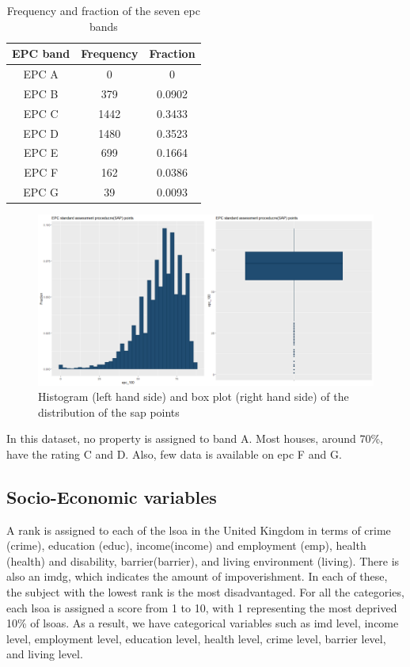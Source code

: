\documentclass[12pt]{article}
\begin{document}
\begin{table}[H]
\centering
\begin{tabular}{c c c} 
 \hline
 EPC band & Frequency & Fraction \\ [0.5ex] 
 \hline
 EPC A & 0 & 0 \\ 
 EPC B & 379 & 0.0902\\
 EPC C & 1442 & 0.3433 \\
 EPC D & 1480 & 0.3523 \\
 EPC E & 699 & 0.1664 \\
 EPC F & 162 & 0.0386 \\
 EPC G & 39 & 0.0093 \\ [1ex] 
 \hline
\end{tabular}
\caption{Frequency and fraction of the seven \acrshort{epc} bands}
\label{table:EPC}
\end{table}


\begin{figure}[H]
    \centering
    \includegraphics[width=17cm]{epc.png}
    \caption{Histogram (left hand side) and box plot (right hand side) of the distribution of the \acrshort{sap} points}
    \label{fig:EPCs}
\end{figure}

In this dataset, no property is assigned to band A. Most houses, around 70\%, have the rating C and D. Also, few data is available on \acrshort{epc} F and G. 

\subsection{Socio-Economic variables}
A rank is assigned to each of the \acrfull{lsoa} in the United Kingdom in terms of crime (\gls{crime}), education (\gls{educ}), income(\gls{income}) and employment (\gls{emp}), health (\gls{health}) and disability, barrier(\gls{barrier}), and living environment (\gls{living}). There is also an \gls{imdg}, which indicates the amount of impoverishment. In each of these, the subject with the lowest rank is the most disadvantaged. For all the categories, each \acrshort{lsoa} is assigned a score from 1 to 10, with 1 representing the most deprived 10\% of \acrshort{lsoa}s. As a result, we have categorical variables such as imd level, income level, employment level, education level, health level, crime level, barrier level, and living level.
\end{document}
